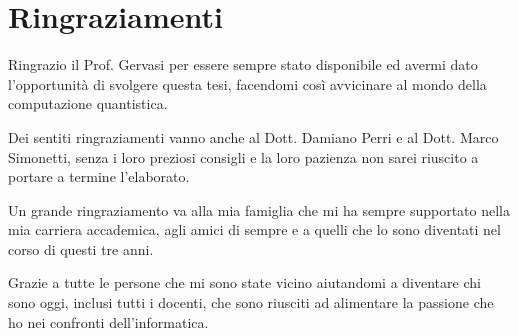 \documentclass[a4paper,12pt]{report}
\begin{document}
\setcounter{tocdepth}{3}
\setcounter{secnumdepth}{3}
\tableofcontents

\listoffigures

\listoftables

\pagestyle{fancy}

\newpage 



\chapter*{Ringraziamenti}
Ringrazio il Prof. Gervasi per essere sempre stato disponibile ed avermi dato l'opportunità di svolgere questa tesi, facendomi così avvicinare al mondo della computazione quantistica.

Dei sentiti ringraziamenti vanno anche al Dott. Damiano Perri e al Dott. Marco Simonetti, senza i loro preziosi consigli e la loro pazienza non sarei riuscito a portare a termine l'elaborato.

Un grande ringraziamento va alla mia famiglia che mi ha sempre supportato nella mia carriera accademica, agli amici di sempre e a quelli che lo sono diventati nel corso di questi tre anni.

Grazie a tutte le persone che mi sono state vicino aiutandomi a diventare chi sono oggi, inclusi tutti i docenti,
che sono riusciti ad alimentare la passione che ho nei confronti dell'informatica.

\appendix
\linespread{1}



\end{document}
